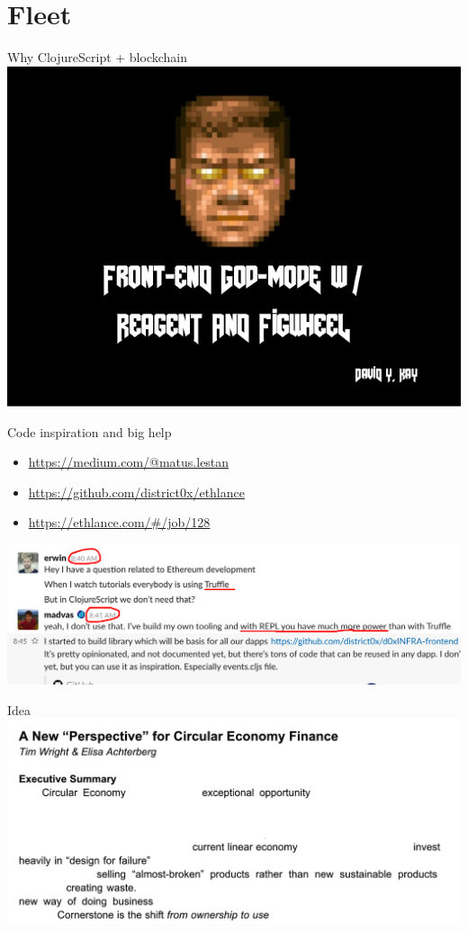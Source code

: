 \documentclass[presentation]{beamer}
\begin{document}
\section{Fleet}
\label{sec-3}
\begin{frame}[label=sec-3-1]{Why ClojureScript + blockchain}
\includegraphics[width=.9\linewidth]{../images/godmode.jpg}
\end{frame}

\begin{frame}[label=sec-3-2]{Code inspiration and big help}
\begin{itemize}
\item \url{https://medium.com/@matus.lestan}
\item \url{https://github.com/district0x/ethlance}
\item \url{https://ethlance.com/\#/job/128}
\end{itemize}

\includegraphics[width=.9\linewidth]{../images/madvas.png}
\end{frame}
\begin{frame}[label=sec-3-3]{Idea}
\includegraphics[width=.9\linewidth]{../images/circular.png}
\end{frame}
\end{document}
